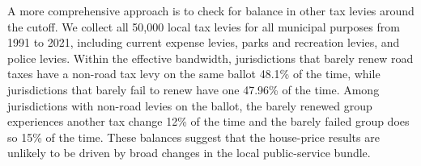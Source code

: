 A more comprehensive approach is to check for balance in other tax levies around the cutoff. We collect all 50,000 local tax levies for all municipal purposes from 1991 to 2021, including current expense levies, parks and recreation levies, and police levies. Within the effective bandwidth, jurisdictions that barely renew road taxes have a non-road tax levy on the same ballot 48.1\% of the time, while jurisdictions that barely fail to renew have one 47.96\% of the time. Among jurisdictions with non-road levies on the ballot, the barely renewed group experiences another tax change 12\% of the time and the barely failed group does so 15\% of the time. These balances suggest that the house-price results are unlikely to be driven by broad changes in the local public-service bundle.


